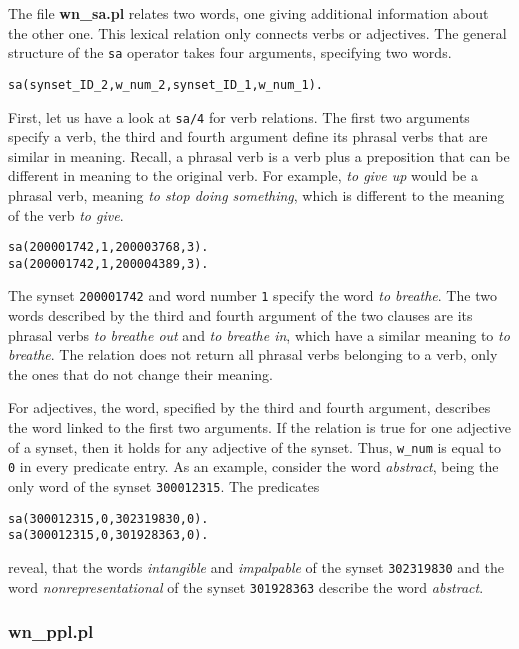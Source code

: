 \documentclass[12pt]{article}
\begin{document}
The file {\bfseries wn\_sa.pl} relates two words, one giving additional information about the other one.
This lexical relation only connects verbs or adjectives.
The general structure of the {\tt sa} operator takes four arguments, specifying two words.
\begin{verbatim}
sa(synset_ID_2,w_num_2,synset_ID_1,w_num_1).
\end{verbatim}
First, let us have a look at {\tt sa/4} for verb relations. The first two arguments specify a verb,
the third and fourth argument define its phrasal verbs that are similar in meaning.
Recall, a phrasal verb is a verb plus a preposition that can be different in meaning to the original verb.
For example, \emph{to give up} would be a phrasal verb, meaning
\emph{to stop doing something}, which is different to the meaning of the verb \emph{to give}.
\begin{verbatim}
sa(200001742,1,200003768,3).
sa(200001742,1,200004389,3).
\end{verbatim}
The synset {\tt 200001742} and word number {\tt 1} specify the word \emph{to breathe}.
The two words described by the third and fourth argument of the two clauses are its phrasal verbs
\emph{to breathe out} and \emph{to breathe in}, which have a similar meaning to \emph{to breathe}.
The relation does not return all phrasal verbs belonging to a verb, only the ones that do not change their meaning.

For adjectives, the word, specified by the third and fourth argument, describes the word linked to the first
two arguments. If the relation is true for one adjective of a synset, then it holds for any adjective of
the synset. Thus, {\tt w\_num} is equal to {\tt 0} in every predicate entry.
As an example, consider the word \emph{abstract}, being the only word of the synset {\tt 300012315}.
The predicates
\begin{verbatim}
sa(300012315,0,302319830,0).
sa(300012315,0,301928363,0).
\end{verbatim}
reveal, that the words \emph{intangible} and \emph{impalpable} of the synset {\tt 302319830}
and the word \emph{nonrepresentational} of the synset
{\tt 301928363} describe the word \emph{abstract}.

\subsubsection{wn\_ppl.pl}
\end{document}

